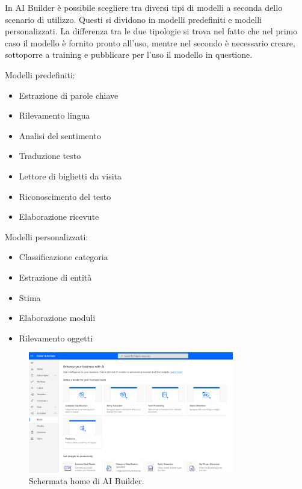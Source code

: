 In AI Builder è possibile scegliere tra diversi tipi di modelli a seconda dello scenario di utilizzo. Questi si dividono in modelli predefiniti e modelli personalizzati.
La differenza tra le due tipologie si trova nel fatto che nel primo caso il modello è fornito pronto all'uso, mentre nel secondo è necessario creare, sottoporre a training e pubblicare per l'uso il modello in questione.

\begin{multicols}{2}
  Modelli predefiniti:
    \begin{itemize}
      \item Estrazione di parole chiave
      \item Rilevamento lingua
      \item Analisi del sentimento
      \item Traduzione testo
      \item Lettore di biglietti da visita
      \item Riconoscimento del testo
      \item Elaborazione ricevute
    \end{itemize}
\columnbreak
  Modelli personalizzati:
    \begin{itemize}
      \item Classificazione categoria
      \item Estrazione di entità
      \item Stima
      \item Elaborazione moduli
      \item Rilevamento oggetti
    \end{itemize}
\end{multicols}

\begin{figure}[ht!]
  \centering
  \includegraphics[width=0.8\textwidth]{ai-builder-home.png}
  \caption{Schermata home di AI Builder.}
  \label{fig:aiBuilderHome}
\end{figure}

